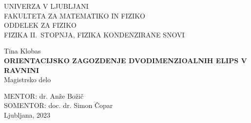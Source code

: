 \pagestyle{empty}
\begin{center}

{\large UNIVERZA V LJUBLJANI\\
 FAKULTETA ZA MATEMATIKO IN FIZIKO\\
ODDELEK ZA FIZIKO\\
FIZIKA II.~STOPNJA, FIZIKA KONDENZIRANE SNOVI\\}


\vspace{4cm}
{\Large Tina Klobas\\}
\vspace{10mm}
{\bf \Large ORIENTACIJSKO ZAGOZDENJE DVODIMENZIOALNIH ELIPS V RAVNINI}\\
\vspace{5mm}
{\large Magistrsko delo}\\

\vfill

{\large MENTOR: dr. Anže Božič\\
SOMENTOR: doc. dr. Simon Čopar\\

\vspace{2cm}
Ljubljana, 2023}

\end{center}




% 




